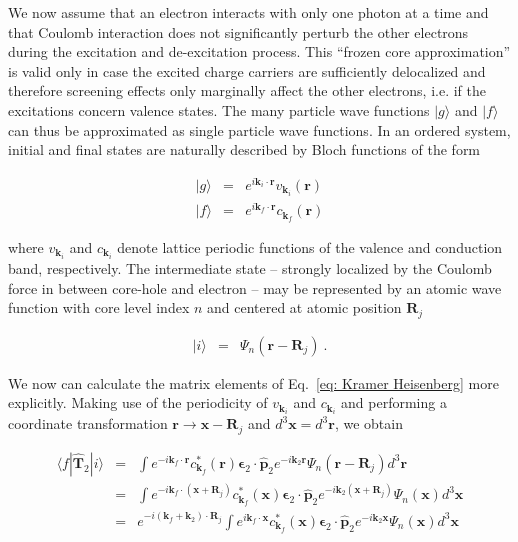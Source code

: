 \documentclass[twocolumn,prb,twocolumn,amsmath,superscriptaddress,nofootinbib,amssymb]{revtex4-1}
\newcommand{\vect}[1]{\boldsymbol{#1}}
\begin{document}
\begin{widetext}
We now assume that an electron interacts with only one photon at a time and that Coulomb interaction does not significantly perturb the other electrons during the excitation and de-excitation process. This ``frozen core approximation'' is valid only in case the excited charge carriers are sufficiently delocalized and therefore screening effects only marginally affect the other electrons, i.e. if the excitations concern valence states. The many particle wave functions $| g\rangle$ and $| f \rangle$ can thus be approximated as single particle wave functions. In an ordered system, initial and final states are naturally described by Bloch functions of the form

\begin{eqnarray}
| g\rangle & = & e^{i\vect{k}_i \cdot \vect{r}} v_{\vect{k}_i}(\vect{r})\nonumber\\
| f\rangle & = & e^{i\vect{k}_f \cdot \vect{r}} c_{\vect{k}_f}(\vect{r})
\end{eqnarray}

\noindent where $v_{\vect{k}_i}$ and $c_{\vect{k}_i}$ denote lattice periodic functions of the valence and conduction band, respectively. The intermediate state -- strongly localized by the Coulomb force in between core-hole and electron -- may be represented by an atomic wave function with core level index $n$ and centered at atomic position $\vect{R}_j$

\begin{eqnarray}
| i\rangle & = & \Psi_n(\vect{r}-\vect{R}_j)~.
\end{eqnarray}

We now can calculate the matrix elements of Eq.~\ref{eq: Kramer Heisenberg} more explicitly. Making use of the periodicity of $v_{\vect{k}_i}$ and $c_{\vect{k}_i}$ and performing a coordinate transformation $\vect{r}\rightarrow \vect{x}-\vect{R}_j$ and $d^3\vect{x}=d^3\vect{r}$, we obtain

\begin{eqnarray}
\langle f|\hat{\vect{T}}_2 |i\rangle &=& \int e^{-i\vect{k}_f\cdot\vect{r}}c^*_{\vect{k}_f}(\vect{r}) \vect{\epsilon}_2\cdot \hat{\vect{p}}_2 e^{-i \vect{k}_2 \vect{r}}\Psi_n(\vect{r}-\vect{R}_j)d^3\vect{r} \nonumber \\
&=& \int e^{-i\vect{k}_f\cdot(\vect{x}+\vect{R}_j)}c^*_{\vect{k}_f}(\vect{x}) \vect{\epsilon}_2\cdot \hat{\vect{p}}_2 e^{-i \vect{k}_2 (\vect{x}+\vect{R}_j)}\Psi_n(\vect{x})d^3\vect{x}\nonumber\\
&=& e^{-i(\vect{k}_f+\vect{k}_2)\cdot\vect{R}_j}
\int e^{i\vect{k}_f\cdot\vect{x}}c^*_{\vect{k}_f}(\vect{x}) \vect{\epsilon}_2\cdot \hat{\vect{p}}_2 e^{-i \vect{k}_2 \vect{x}}\Psi_n(\vect{x})d^3\vect{x}
\end{eqnarray}


\end{widetext}
\end{document}
